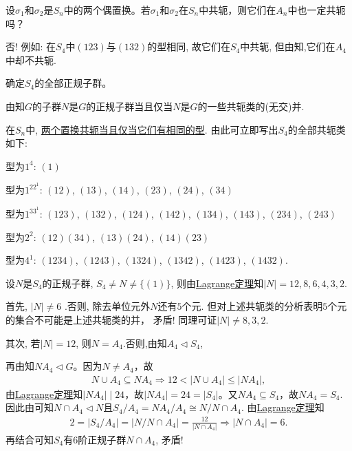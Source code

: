\documentclass[../../main.tex]{subfiles}%
\begin{document}
\begin{example}
设$\sigma_1$和$\sigma_2$是$S_n$中的两个偶置换。若$\sigma_1$和$\sigma_2$在$S_n$中共轭，则它们在$A_n$中也一定共轭吗？
\end{example}
\begin{solution}
否! 例如: 在$S_4$中$(123)$与$(132)$的型相同, 故它们在$S_4$中共轭, 但由知,它们在$A_4$中却不共轭.

\end{solution}

\begin{example}
确定$S_4$的全部正规子群。
\end{example}
\begin{solution}
由知$G$的子群$N$是$G$的正规子群当且仅当$N$是$G$的一些共轭类的(无交)并.

在$S_n$中, \hyperref[theorem:对称群中置换共轭等价于型相同]{两个置换共轭当且仅当它们有相同的型}. 由此可立即写出$S_4$的全部共轭类如下:

型为$1^4$: $(1)$

型为$1^22^1$: $(12)$, $(13)$, $(14)$, $(23)$, $(24)$, $(34)$

型为$1^33^1$: $(123)$, $(132)$, $(124)$, $(142)$, $(134)$, $(143)$, $(234)$, $(243)$

型为$2^2$: $(12)(34)$, $(13)(24)$, $(14)(23)$

型为$4^1$: $(1234)$, $(1243)$, $(1324)$, $(1342)$, $(1423)$, $(1432)$.

设$N$是$S_4$的正规子群, $S_4 \neq N \neq \{(1)\}$, 则由\hyperref[theorem:抽象代数--Lagrange定理]{Lagrange定理}知$|N| = 12, 8, 6, 4, 3, 2$.

首先, $|N| \neq 6$ .否则, 除去单位元外$N$还有$5$个元. 但对上述共轭类的分析表明$5$个元的集合不可能是上述共轭类的并， 矛盾! 同理可证$|N| \neq 8, 3, 2$.

其次, 若$|N| = 12$, 则$N = A_4$.否则,由知$A_4\lhd S_4$,

再由知$NA_4\lhd G$。因为$N\neq A_4$，故\begin{align*}
N\cup A_4\subseteq NA_4\Longrightarrow 12<\left| N\cup A_4 \right|\leqslant \left| NA_4 \right|,
\end{align*}
由\hyperref[theorem:抽象代数--Lagrange定理]{Lagrange定理}知$\left| NA_4 \right|\mid 24$，故$\left| NA_4 \right|=24=\left| S_4 \right|$。又$NA_4\subseteq S_4$，故$NA_4=S_4$.
因此由可知$N\cap A_4\lhd N$且$S_4/A_4 = NA_4/A_4 \cong N/N \cap A_4$. 由\hyperref[theorem:抽象代数--Lagrange定理]{Lagrange定理}知
\begin{align*}
2=|S_4/A_4|=|N/N\cap A_4|=\frac{12}{|N\cap A_4|}\Longrightarrow |N\cap A_4| = 6.
\end{align*}
再结合可知$S_4$有$6$阶正规子群$N \cap A_4$, 矛盾!


\end{solution}
\end{document}
